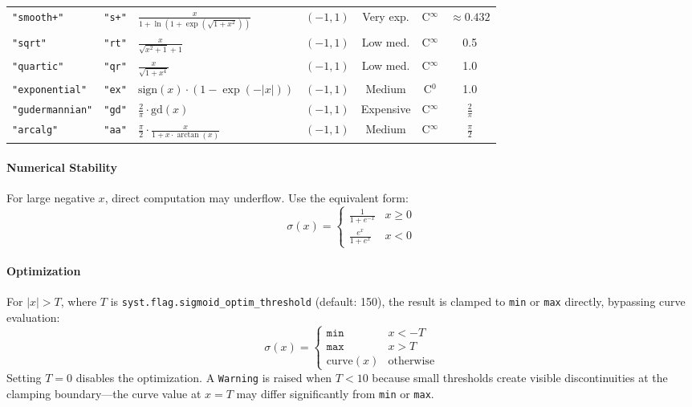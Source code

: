 \begin{center}
\begin{tabular}{llllccc}
\texttt{"smooth+"} & \texttt{"s+"} & $\frac{x}{1 + \ln\left(1 + \exp\left(\sqrt{1+x^2}\right)\right)}$ & $(-1, 1)$ & Very exp. & C$^\infty$ & $\approx 0.432$ \\
\texttt{"sqrt"} & \texttt{"rt"} & $\frac{x}{\sqrt{x^2+1}+1}$ & $(-1, 1)$ & Low med. & C$^\infty$ & 0.5 \\
\texttt{"quartic"} & \texttt{"qr"} & $\frac{x}{\sqrt{1+x^4}}$ & $(-1, 1)$ & Low med. & C$^\infty$ & 1.0 \\
\texttt{"exponential"} & \texttt{"ex"} & $\text{sign}\left(x\right) \cdot \left(1 - \exp\left(-\left|x\right|\right)\right)$ & $(-1, 1)$ & Medium & C$^0$ & 1.0 \\
\texttt{"gudermannian"} & \texttt{"gd"} & $\frac{2}{\pi} \cdot \text{gd}\left(x\right)$ & $(-1, 1)$ & Expensive & C$^\infty$ & $\frac{2}{\pi}$ \\
\texttt{"arcalg"} & \texttt{"aa"} & $\frac{\pi}{2} \cdot \frac{x}{1 + x \cdot \arctan\left(x\right)}$ & $(-1, 1)$ & Medium & C$^\infty$ & $\frac{\pi}{2}$ \\
\end{tabular}
\end{center}

\paragraph{Numerical Stability}
For large negative $x$, direct computation may underflow. Use the equivalent form:
\[
\sigma(x) = \begin{cases} \frac{1}{1 + e^{-x}} & x \geq 0 \\ \frac{e^x}{1 + e^x} & x < 0 \end{cases}
\]

\paragraph{Optimization}
For $|x| > T$, where $T$ is \texttt{syst.flag.sigmoid\_optim\_threshold} (default: 150), the result is clamped to \texttt{min} or \texttt{max} directly, bypassing curve evaluation:
\[
\sigma(x) = \begin{cases} \texttt{min} & x < -T \\ \texttt{max} & x > T \\ \text{curve}(x) & \text{otherwise} \end{cases}
\]
Setting $T = 0$ disables the optimization. A \texttt{Warning} is raised when $T < 10$ because small thresholds create visible discontinuities at the clamping boundary---the curve value at $x = T$ may differ significantly from \texttt{min} or \texttt{max}.

